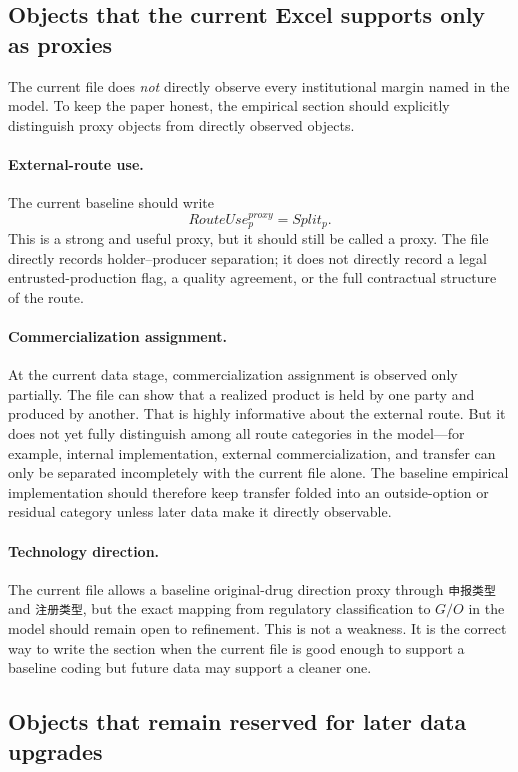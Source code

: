 \documentclass[12pt]{article}
\begin{document}
\subsection{Objects that the current Excel supports only as proxies}

The current file does \emph{not} directly observe every institutional margin named in the model.
To keep the paper honest, the empirical section should explicitly distinguish proxy objects from
directly observed objects.

\paragraph{External-route use.}
The current baseline should write
\[
RouteUse_p^{proxy}=Split_p.
\]
This is a strong and useful proxy, but it should still be called a proxy. The file directly records
holder--producer separation; it does not directly record a legal entrusted-production flag, a quality
agreement, or the full contractual structure of the route.

\paragraph{Commercialization assignment.}
At the current data stage, commercialization assignment is observed only partially. The file can
show that a realized product is held by one party and produced by another. That is highly
informative about the external route. But it does not yet fully distinguish among all route
categories in the model---for example, internal implementation, external commercialization, and
transfer can only be separated incompletely with the current file alone. The baseline empirical
implementation should therefore keep transfer folded into an outside-option or residual category
unless later data make it directly observable.

\paragraph{Technology direction.}
The current file allows a baseline original-drug direction proxy through \texttt{申报类型} and
\texttt{注册类型}, but the exact mapping from regulatory classification to \(G/O\) in the model
should remain open to refinement. This is not a weakness. It is the correct way to write the
section when the current file is good enough to support a baseline coding but future data may
support a cleaner one.

\subsection{Objects that remain reserved for later data upgrades}
\end{document}
